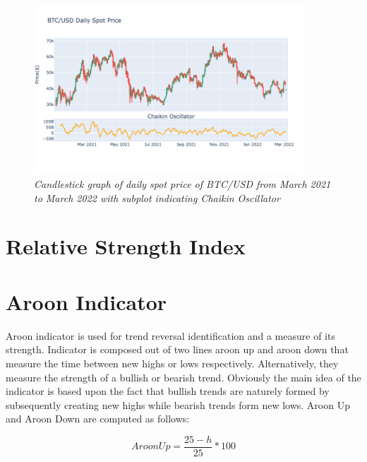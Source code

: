 \begin{figure}[h]

\begin{center}
	\includegraphics[width=0.9\textwidth]{Chaikin.png}
\end{center}

\caption{\textit{ Candlestick graph of daily spot price of BTC/USD from March 2021 to March 2022 with subplot indicating Chaikin Oscillator}}

\end{figure}


\section{Relative Strength Index}







\section{Aroon Indicator}

Aroon indicator is used for trend reversal identification and a measure of its strength. Indicator is composed out of two lines aroon up and aroon down that measure the time between new highs or lows respectively. Alternatively, they measure the strength of a bullish or bearish trend. Obviously the main idea of the indicator is based upon the fact that bullish trends are naturely formed by subsequently creating new highs while bearish trends form new lows. Aroon Up and Aroon Down are computed as follows:

\begin{equation}
Aroon Up = \frac{25 - h}{25} * 100
\end{equation}
 
